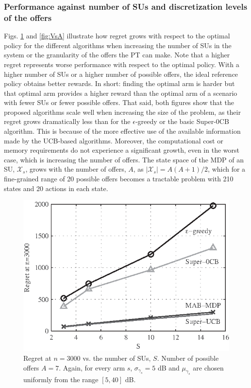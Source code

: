 \subsubsection{Performance against number of SUs and discretization levels of the offers}

Figs. \ref{fig:VsN} and \ref{fig:VsA} illustrate how regret grows with respect to the optimal policy for the different algorithms when increasing the number of SUs in the system or the granularity of the offers the PT can make.
Note that a higher regret represents worse performance with respect to the optimal policy.
With a higher number of SUs or a higher number of possible offers, the ideal reference policy obtains better rewards. 
In short: finding the optimal arm is harder but that optimal arm provides a higher reward than the optimal arm of a scenario with fewer SUs or fewer possible offers. 
That said, both figures show that the proposed algorithms scale well when increasing the size of the problem, as their regret grows dramatically less than for the $\epsilon$-greedy or the basic Super-0CB algorithm. 
This is because of the more effective use of the available information made by the UCB-based algorithms. 
Moreover, the computational cost or memory requirements do not experience a significant growth, even in the worst case, which is increasing the number of offers. 
The state space of the MDP of an SU, $\mathcal{X}_s$, grows with the number of offers, $A$, as $|\mathcal{X}_s| = A(A+1)/2$, which for a fine-grained range of 20 possible offers becomes a tractable problem with 210 states and 20 actions in each state. 
\begin{figure}[!t]
\centering
\includegraphics{VsN.eps}
\caption{Regret at $n = 3000$ vs. the number of SUs, $S$. Number of possible offers $A = 7$. Again, for every arm $s$, $\sigma_{\gamma_s} = 5$ dB and $\mu_{\gamma_s}$ are chosen uniformly from the range $[5,40]$ dB.}
\label{fig:VsN}
\end{figure}

